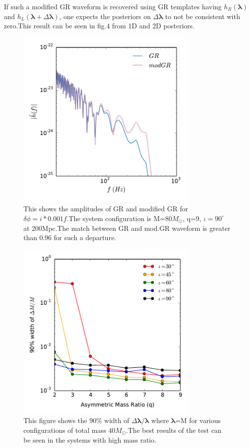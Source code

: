 \documentclass[prl,preprintnumbers,twocolumn,eqsecnum,floatfix,a4paper,nofootinbib,superscriptaddress]{revtex4}
\newcommand{\blambda}{\bm{\lambda}}
\begin{document}
If such a modified GR waveform is recovered using GR templates having $h_R(\blambda)$ and $h_L(\blambda+\Delta \blambda)$, one expects
the posteriors on $\Delta \blambda$ to not be consistent with
zero.This result can be seen in fig.4 from 1D and 2D posteriors.
\begin{figure}[h]
	\includegraphics*[width=3.5in]{figs/fig2.pdf}
	\caption{This shows the amplitudes of GR and modified GR for $\delta \phi =i*0.001f$.The system configuration is M=80$M_{\odot}$, q=9, $\iota=90^{\circ}$ at 200Mpc.The match between GR and mod.GR waveform is greater than 0.96 for such a departure.}
\label{fig:mod_gr_waveform}
\end{figure}

\begin{figure}[h]
	\includegraphics*[width=3.5in]{figs/fig3.pdf}
	\caption{This figure shows the 90$\%$ width of $\Delta \blambda/\blambda$ where $\blambda$=M for various configurations of total mass $40M_{\odot}$.The best results of the test can be seen in the systems with high mass ratio.}
\end{figure}
\end{document}
